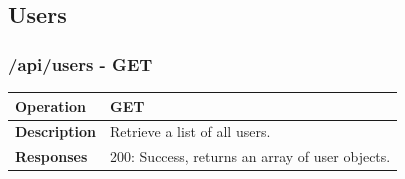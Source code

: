 

\subsection{Users}

\subsubsection*{/api/users - GET}
\begin{tabular}{|>{\raggedright\arraybackslash}p{3cm}|p{12cm}|}
\hline
\textbf{Operation} & GET \\
\hline
\textbf{Description} & Retrieve a list of all users. \\
\hline
\textbf{Responses} & 200: Success, returns an array of user objects. \\
\hline
\end{tabular}

